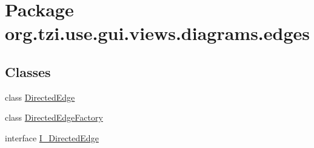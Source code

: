 \hypertarget{namespaceorg_1_1tzi_1_1use_1_1gui_1_1views_1_1diagrams_1_1edges}{\section{Package org.\-tzi.\-use.\-gui.\-views.\-diagrams.\-edges}
\label{namespaceorg_1_1tzi_1_1use_1_1gui_1_1views_1_1diagrams_1_1edges}
}
\subsection*{Classes}
\begin{DoxyCompactItemize}
\item 
class \hyperlink{classorg_1_1tzi_1_1use_1_1gui_1_1views_1_1diagrams_1_1edges_1_1_directed_edge}{Directed\-Edge}
\item 
class \hyperlink{classorg_1_1tzi_1_1use_1_1gui_1_1views_1_1diagrams_1_1edges_1_1_directed_edge_factory}{Directed\-Edge\-Factory}
\item 
interface \hyperlink{interfaceorg_1_1tzi_1_1use_1_1gui_1_1views_1_1diagrams_1_1edges_1_1_i___directed_edge}{I\-\_\-\-Directed\-Edge}
\end{DoxyCompactItemize}
